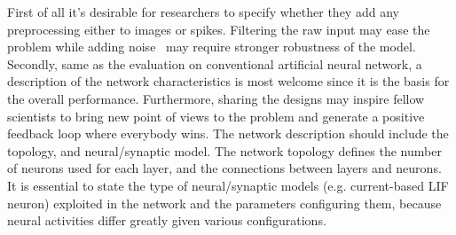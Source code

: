 First of all it's desirable for researchers to specify whether they add any preprocessing either to images or spikes.
Filtering the raw input may ease the problem while adding noise~\citep{best-practice-nn-img} may require stronger robustness of the model.
Secondly, same as the evaluation on conventional artificial neural network, a description of the network characteristics is most welcome since it is the basis for the overall performance.
Furthermore, sharing the designs may inspire fellow scientists to bring new point of views to the problem and generate a positive feedback loop where everybody wins.
The network description should include the topology, and neural/synaptic model.
The network topology defines the number of neurons used for each layer, and the connections between layers and neurons.
It is essential to state the type of neural/synaptic models (e.g. current-based LIF neuron) exploited in the network and the parameters configuring them, because neural activities differ greatly given various configurations.
